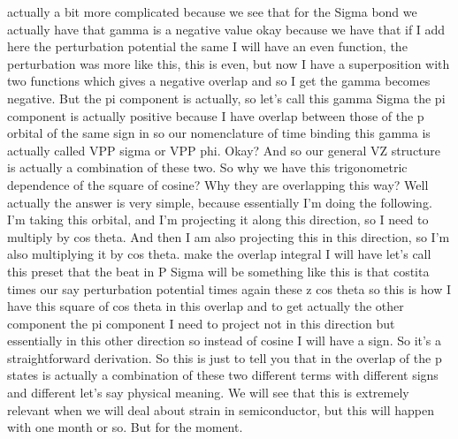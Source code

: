 actually a bit more complicated because we see that for the Sigma bond we actually have that gamma is a negative value okay because we have that if I add here the perturbation potential the same I will have an even function, the perturbation was more like this, this is even, but now I have a superposition with two functions which gives a negative overlap and so I get the gamma becomes negative. But the pi component is actually, so let's call this gamma Sigma the pi component is actually positive because I have overlap between those of the p orbital of the same sign in so our nomenclature of time binding this gamma is actually called VPP sigma or VPP phi. Okay? And so our general VZ structure is actually a combination of these two. So why we have this trigonometric dependence of the square of cosine? Why they are overlapping this way? Well actually the answer is very simple, because essentially I'm doing the following. I'm taking this orbital, and I'm projecting it along this direction, so I need to multiply by cos theta. And then I am also projecting this in this direction, so I'm also multiplying it by cos theta. make the overlap integral I will have let's call this preset that the beat in P Sigma will be something like this is that costita times our say perturbation potential times again these z cos theta so this is how I have this square of cos theta in this overlap and to get actually the other component the pi component I need to project not in this direction but essentially in this other direction so instead of cosine I will have a sign. So it's a straightforward derivation. So this is just to tell you that in the overlap of the p states is actually a combination of these two different terms with different signs and different let's say physical meaning. We will see that this is extremely relevant when we will deal about strain in semiconductor, but this will happen with one month or so. But for the moment.
